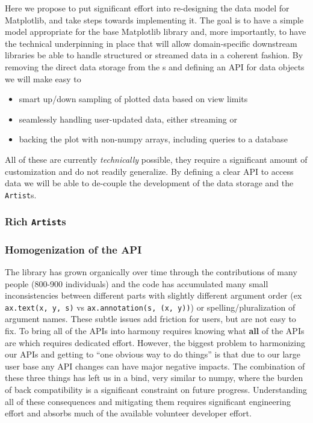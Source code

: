 \documentclass[11pt]{article}  %
\begin{document}
Here we propose to put significant effort into re-designing the data
model for Matplotlib, and take steps towards implementing it.  The
goal is to have a simple model appropriate for the base Matplotlib
library and, more importantly, to have the technical underpinning in
place that will allow domain-specific downstream libraries be able to
handle structured or streamed data in a coherent fashion.  By removing
the direct data storage from the s and defining an API
for data objects we will make easy to
\begin{itemize}
  \item smart up/down sampling of plotted data based on view limits
  \item seamlessly handling user-updated data, either streaming or
  \item backing the plot with non-numpy arrays, including queries to a
    database
\end{itemize}
All of these are currently \textit{technically} possible, they require
a significant amount of customization and do not readily generalize.
By defining a clear API to access data we will be able to de-couple the
development of the data storage and the \texttt{Artist}s.


\subsubsection{Rich \texttt{Artist}s}

\subsubsection{Homogenization of the API}

The library has grown organically over time through the contributions
of many people (800-900 individuals) and the code has accumulated many
small inconsistencies between different parts with slightly different
argument order (ex \texttt{ax.text(x, y, s)} vs
\texttt{ax.annotation(s, (x, y))}) or spelling/pluralization of
argument names. These subtle issues add friction for users, but are
not easy to fix.  To bring all of the APIs into harmony requires
knowing what \textbf{all} of the APIs are which requires dedicated
effort.  However, the biggest problem to harmonizing our APIs and
getting to ``one obvious way to do things'' is that due to our large
user base any API changes can have major negative impacts.  The
combination of these three things has left us in a bind, very similar
to numpy, where the burden of back compatibility is a significant
constraint on future progress.  Understanding all of these consequences
and mitigating them requires significant engineering effort and
absorbs much of the available volunteer developer effort.
\end{document}
